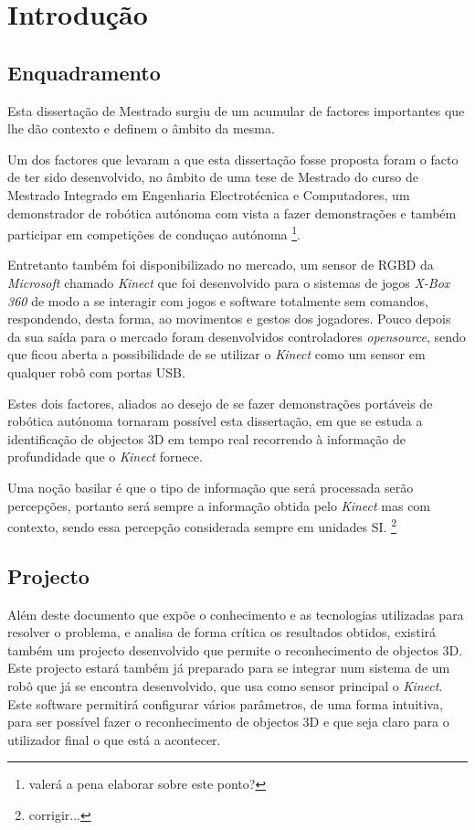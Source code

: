 \chapter{Introdução} \label{chap:intro}

\section{Enquadramento} \label{sec:context}

Esta dissertação de Mestrado surgiu de um acumular de factores importantes que lhe dão 
contexto e definem o âmbito da mesma.

Um dos factores que levaram a que esta dissertação fosse proposta foram o facto de ter sido
desenvolvido, no âmbito de uma tese de Mestrado do curso de Mestrado Integrado em
Engenharia Electrotécnica e Computadores, um demonstrador de robótica autónoma com vista
a fazer demonstrações e também participar em competições de conduçao autónoma
\footnote{valerá a pena elaborar sobre este ponto?}. 

Entretanto também foi disponibilizado no mercado, um sensor de RGBD da \emph{Microsoft} chamado 
\emph{Kinect} que foi desenvolvido para o sistemas de jogos \emph{X-Box 360} de modo a
se interagir com jogos e software totalmente sem comandos, respondendo, desta forma, ao movimentos e gestos
dos jogadores. Pouco depois da sua saída para o mercado foram desenvolvidos controladores \emph{opensource},
sendo que ficou aberta a possibilidade de se utilizar o \emph{Kinect} como um sensor em qualquer
robô com portas USB.

Estes dois factores, aliados ao desejo de se fazer demonstrações portáveis de robótica autónoma 
tornaram possível esta dissertação, em que se estuda a identificação de objectos 3D 
em tempo real recorrendo à informação de profundidade que o \emph{Kinect} fornece.

Uma noção basilar é que o tipo de informação que será processada serão percepções, portanto
será sempre a informação obtida pelo \emph{Kinect} mas com contexto, sendo essa percepção
considerada sempre em unidades SI. \footnote{corrigir...}

\section{Projecto} \label{sec:proj}

Além deste documento que expõe o conhecimento e as tecnologias utilizadas para resolver
o problema, e analisa de forma crítica os resultados obtidos, existirá também um projecto
desenvolvido que permite o reconhecimento de objectos 3D. Este projecto estará também já preparado
para se integrar num sistema de um robô que já se encontra desenvolvido, que usa como sensor
principal o \emph{Kinect}. Este software permitirá configurar vários parâmetros, 
de uma forma intuitiva, para ser possível fazer o reconhecimento de objectos 3D e que
seja claro para o utilizador final o que está a acontecer.


